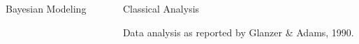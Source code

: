 \documentclass[final]{beamer}
\newlength{\sepwid}
\newlength{\onecolwid}
\newlength{\twocolwid}
\begin{document}
\begin{frame}[t]
\begin{columns}[t]
\begin{column}{\twocolwid}
\begin{columns}[t,totalwidth=\twocolwid]
\begin{column}{\onecolwid}
\begin{alertblock}{Bayesian Modeling}
\end{alertblock}



\end{column} %

\end{columns} %


\begin{columns}[t,totalwidth=\twocolwid] %

\begin{column}{\onecolwid} %


\end{column} %

\end{columns} %

\end{column} %

\begin{column}{\sepwid}\end{column} %

\begin{column}{\onecolwid} %


\begin{alertblock}{Classical Analysis}

Data analysis as reported by Glanzer \& Adams, 1990.

$\qquad$


\end{alertblock}
\end{column}
\end{columns}
\end{frame}
\end{document}
